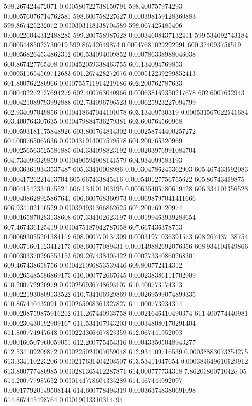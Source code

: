 {598.267424472071 0.000580722738150791
598.400757974293 0.000576076714762581
598.600758227627 0.000398159128360883
598.867425232072 0.000303118138704589
599.067425485406 0.000226044312488285
599.200758987628 0.00034608437132411
599.534092743184 0.00054485023730019
599.86742649874 0.00047681029292991
600.334093756519 0.000568264534862312
600.534094009852 0.000786338988046038
600.867427765408 0.000452059338463755
601.134094769853 0.000511654569712683
601.267428272076 0.000512239299852413
601.800762280966 0.000755711914219186
602.200762787633 0.000402272137694279
602.400763040966 0.000638169350217678
602.6007632943 0.000421089793992888
602.734096796523 0.000625923227094799
602.934097049856 0.000418647044101078
603.13409730319 0.000531567022541684
603.400764307635 0.000479884736279381
603.600764560968 0.000593181175848926
603.800764814302 0.000258744400257272
604.000765067636 0.000431914007579578
604.200765320969 0.000256563525581885
604.334098823192 0.000203976991084704
604.734099329859 0.000490594908141579
604.934099583193 0.000363619343537487
605.33410008986 0.000304786245362903
605.467433592083 0.00041726221413704
605.667433845416 0.000540127756755622
605.86743409875 0.00041542334075521
606.134101103195 0.000635405780619428
606.334101356528 0.000408628925867641
606.600768360973 0.000698797041411666
606.934102116529 0.000394931366862625
607.200769120974 0.000165870283138608
607.334102623197 0.000199463939288654
607.467436125419 0.000475187942787058
607.667436378753 0.000693055201384119
608.000770134309 0.00031971036391573
608.267437138754 0.000371601123412175
608.60077089431 0.000149882692076356
608.934104649866 0.000303370296553153
609.267438405422 0.000273340860268301
609.467438658756 0.000421096853539446
609.800772414312 0.000265485586869175
610.000772667645 0.000238386111702909
610.200772920979 0.000250936748693107
610.400773174313 0.000221930809133522
610.734106929869 0.000269599074899335
610.867440432091 0.000265908361327827
611.000773934314 0.000208759875916212
611.267440938758 0.00021646410490374
611.400774440981 0.000230430192909167
611.534107943203 0.000348080170291404
611.800774947648 0.000224306467823359
612.067441952093 0.000160507960059051
612.200775454316 0.000433505048943277
612.534109209872 0.000225024007059048
612.934109716539 0.00038883073254275
613.334110223206 0.000217631404208507
613.53411047654 0.000384649610629912
613.800777480985 0.000281365412287871
614.000777734318 7.8620380071042e-05
614.200777987652 0.000144778604335289
614.467444992097 0.000177920149508144
614.600778494319 0.000363748380691098
614.867445498764 0.00019013310314494
}
